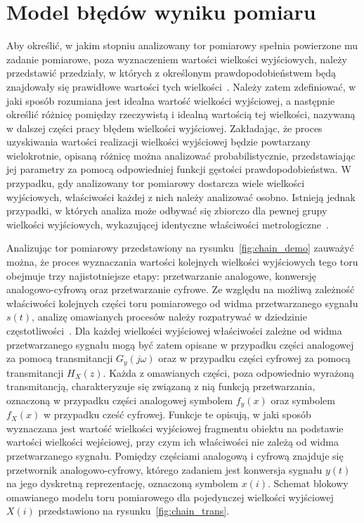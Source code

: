 \chapter{Model błędów wyniku pomiaru}

Aby określić, w jakim stopniu analizowany tor pomiarowy spełnia powierzone mu zadanie pomiarowe, poza wyznaczeniem wartości wielkości wyjściowych, należy przedstawić przedziały, w których z określonym prawdopodobieństwem będą znajdowały się prawidłowe wartości tych wielkości~\cite{jcgm_guide}. Należy zatem zdefiniować, w jaki sposób rozumiana jest idealna wartość wielkości wyjściowej, a następnie określić różnicę pomiędzy rzeczywistą i idealną wartością tej wielkości, nazywaną w dalszej części pracy błędem wielkości wyjściowej. Zakładając, że proces uzyskiwania wartości realizacji wielkości wyjściowej będzie powtarzany wielokrotnie, opisaną różnicę można analizować probabilistycznie, przedstawiając jej parametry za pomocą odpowiedniej funkcji gęstości prawdopodobieństwa. W przypadku, gdy analizowany tor pomiarowy dostarcza wiele wielkości wyjściowych, właściwości każdej z nich należy analizować osobno. Istnieją jednak przypadki, w których analiza może odbywać się zbiorczo dla pewnej grupy wielkości wyjściowych, wykazującej identyczne właściwości metrologiczne~\cite{auth_electronics}.

Analizując tor pomiarowy przedstawiony na rysunku~\ref{fig:chain_demo} zauważyć można, że proces wyznaczania wartości kolejnych wielkości wyjściowych tego toru obejmuje trzy najistotniejsze etapy: przetwarzanie analogowe, konwersję analogowo-cyfrową oraz przetwarzanie cyfrowe. Ze względu na możliwą zależność właściwości kolejnych części toru pomiarowego od widma przetwarzanego sygnału $s(t)$, analizę omawianych procesów należy rozpatrywać w dziedzinie częstotliwości~\cite{jakubiec_system}. Dla każdej wielkości wyjściowej właściwości zależne od widma przetwarzanego sygnału mogą być zatem opisane w przypadku części analogowej za pomocą transmitancji $G_{y}(j\omega)$ oraz w przypadku części cyfrowej za pomocą transmitancji $H_{X}(z)$. Każda z omawianych części, poza odpowiednio wyrażoną transmitancją, charakteryzuje się związaną z nią funkcją przetwarzania, oznaczoną w przypadku części analogowej symbolem $f_{y}(x)$ oraz symbolem $f_{X}(x)$ w przypadku cześć cyfrowej. Funkcje te opisują, w jaki sposób wyznaczana jest wartość wielkości wyjściowej fragmentu obiektu na podstawie wartości wielkości wejściowej, przy czym ich właściwości nie zależą od widma przetwarzanego sygnału. Pomiędzy częściami analogową i cyfrową znajduje się przetwornik analogowo-cyfrowy, którego zadaniem jest konwersja sygnału $y(t)$ na jego dyskretną reprezentację, oznaczoną symbolem $x(i)$. Schemat blokowy omawianego modelu toru pomiarowego dla pojedynczej wielkości wyjściowej $X(i)$ przedstawiono na rysunku~\ref{fig:chain_trans}.

